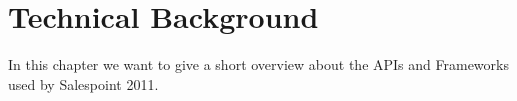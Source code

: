 \chapter{Technical Background}
In this chapter we want to give a short overview about the APIs and Frameworks used by Salespoint 2011.



